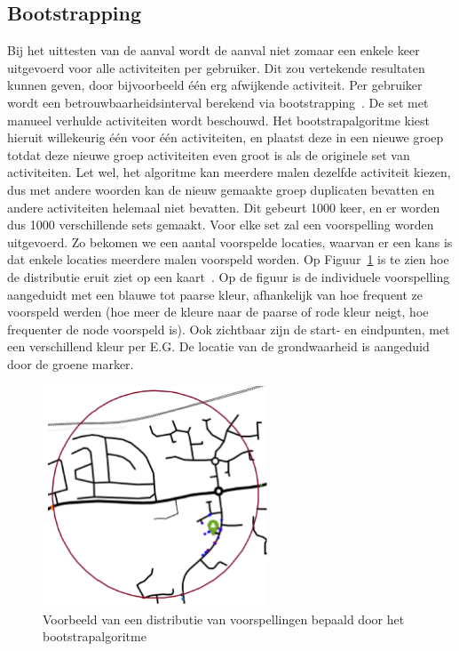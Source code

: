 \subsection{Bootstrapping}
Bij het uittesten van de aanval wordt de aanval niet zomaar een enkele keer
uitgevoerd voor alle activiteiten per gebruiker. Dit zou vertekende resultaten
kunnen geven, door bijvoorbeeld één erg afwijkende activiteit. Per gebruiker
wordt een betrouwbaarheidsinterval berekend via bootstrapping~\cite{Dhondt,
    Verdonck_2022}. De set met manueel verhulde activiteiten wordt beschouwd. Het
bootstrapalgoritme kiest hieruit willekeurig één voor één activiteiten, en
plaatst deze in een nieuwe groep totdat deze nieuwe groep activiteiten even
groot is als de originele set van activiteiten. Let wel, het algoritme kan
meerdere malen dezelfde activiteit kiezen, dus met andere woorden kan de nieuw
gemaakte groep duplicaten bevatten en andere activiteiten helemaal niet
bevatten. Dit gebeurt 1000 keer, en er worden dus 1000 verschillende sets
gemaakt. Voor elke set zal een voorspelling worden uitgevoerd. Zo bekomen we
een aantal voorspelde locaties, waarvan er een kans is dat enkele locaties
meerdere malen voorspeld worden. Op Figuur~\ref{fig:bootstrapping} is te zien
hoe de distributie eruit ziet op een kaart~\cite{Verdonck_2022}. Op de figuur
is de individuele voorspelling aangeduidt met een blauwe tot paarse kleur,
afhankelijk van hoe frequent ze voorspeld werden (hoe meer de kleure naar de
paarse of rode kleur neigt, hoe frequenter de node voorspeld is). Ook zichtbaar
zijn de start- en eindpunten, met een verschillend kleur per \ac{E.G.} De
locatie van de grondwaarheid is aangeduid door de groene marker.

\begin{figure}[h]
    \centering
    \includegraphics[width=0.6\textwidth]{fig/bootstrapping.png}
    \caption{Voorbeeld van een distributie van voorspellingen bepaald door het bootstrapalgoritme~\cite{Verdonck_2022}}\label{fig:bootstrapping}
\end{figure}

